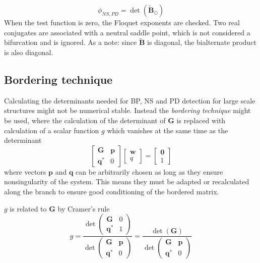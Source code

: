\begin{equation}
  \phi_{NS,PD} = \det \left( \tilde{\bm B}_\odot \right)
\end{equation}
When the test function is zero, the Floquet exponents are checked. Two real
conjugates are associated with a neutral saddle point, which is not considered a
bifurcation and is ignored.
As a note: since $\tilde{\bm B}$ is diagonal, the bialternate product is also
diagonal.

\subsection{Bordering technique}
\label{sec:bordering_tech}

Calculating the determinants needed for BP, NS and PD detection for large
scale structures might not be numerical stable. Instead the \textit{bordering
  technique} might be used, where the calculation of the determinant of $\bm G$
is replaced with calculation of a scalar function $g$ which vanishes at the same
time as the determinant \autocite{kuznetsov2013a}
\begin{equation}
  \begin{bmatrix}
    \bm G & \bm p \\
    \bm q^* & 0
  \end{bmatrix}
  \begin{bmatrix}
    \bm w \\ q
  \end{bmatrix}
  =
  \begin{bmatrix}
    \bm 0 \\ 1
  \end{bmatrix}
  \label{eq:bordered_system}
\end{equation}
where vectors $\bm p$ and $\bm q$ can be arbitrarily chosen as long as they
ensure nonsingularity of the system. This means they must be adapted or
recalculated along the branch to ensure good conditioning of the bordered
matrix.

$g$ is related to $\bm G$ by Cramer's rule
\begin{equation}
  g = \frac{\det
    \begin{pmatrix}
      \bm G & 0 \\
      \bm q^* & 1
    \end{pmatrix}}
  {\det
    \begin{pmatrix}
      \bm G & \bm p \\
      \bm q^* & 0
    \end{pmatrix}}
  =
  \frac{\det(\bm G)}
  {\det
    \begin{pmatrix}
      \bm G & \bm p \\
      \bm q^* & 0
    \end{pmatrix}}
\end{equation}


